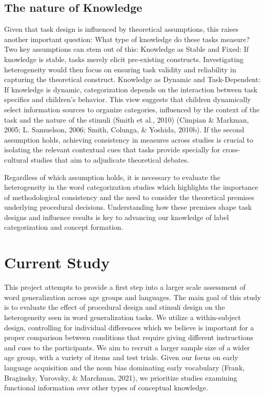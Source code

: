 \documentclass[10pt, letterpaper]{article}
\begin{document}
\hypertarget{the-nature-of-knowledge}{%
\subsection{The nature of Knowledge}\label{the-nature-of-knowledge}}

Given that task design is influenced by theoretical assumptions, this
raises another important question: What type of knowledge do these tasks
measure? Two key assumptions can stem out of this: Knowledge as Stable
and Fixed: If knowledge is stable, tasks merely elicit pre-existing
constructs. Investigating heterogeneity would then focus on ensuring
task validity and reliability in capturing the theoretical construct.
Knowledge as Dynamic and Task-Dependent: If knowledge is dynamic,
categorization depends on the interaction between task specifics and
children's behavior. This view suggests that children dynamically select
information sources to organize categories, influenced by the context of
the task and the nature of the stimuli (Smith et al., 2010) (Cimpian \&
Markman, 2005; L. Samuelson, 2006; Smith, Colunga, \& Yoshida, 2010b).
If the second assumption holds, achieving consistency in measures across
studies is crucial to isolating the relevant contextual cues that tasks
provide specially for cross-cultural studies that aim to adjudicate
theoretical debates.

Regardless of which assumption holds, it is necessary to evaluate the
heterogeneity in the word categorization studies which highlights the
importance of methodological consistency and the need to consider the
theoretical premises underlying procedural decisions. Understanding how
these premises shape task designs and influence results is key to
advancing our knowledge of label categorization and concept formation.

\hypertarget{current-study}{%
\section{Current Study}\label{current-study}}

This project attempts to provide a first step into a larger scale
assessment of word generalization across age groups and languages. The
main goal of this study is to evaluate the effect of procedural design
and stimuli design on the heterogeneity seen in word generalization
tasks. We utilize a within-subject design, controlling for individual
differences which we believe is important for a proper comparison
between conditions that require giving different instructions and cues
to the participants. We aim to recruit a larger sample size of a wider
age group, with a variety of items and test trials. Given our focus on
early language acquisition and the noun bias dominating early vocabulary
(Frank, Braginsky, Yurovsky, \& Marchman, 2021), we prioritize studies
examining functional information over other types of conceptual
knowledge.
\end{document}
